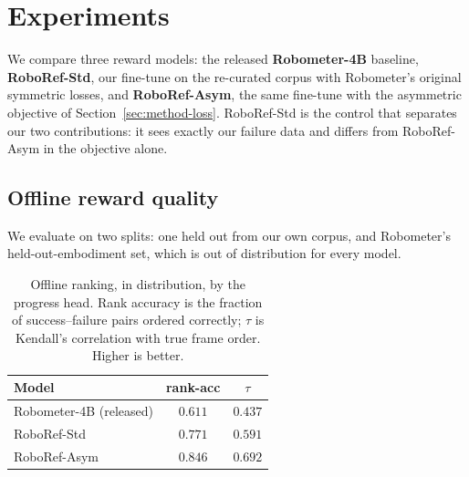 \section{Experiments}
\label{sec:results}

We compare three reward models: the released \textbf{Robometer-4B} baseline,
\textbf{RoboRef-Std}, our fine-tune on the re-curated corpus with Robometer's
original symmetric losses, and \textbf{RoboRef-Asym}, the same fine-tune with the
asymmetric objective of Section~\ref{sec:method-loss}. RoboRef-Std is the control
that separates our two contributions: it sees exactly our failure data and
differs from RoboRef-Asym in the objective alone.

\subsection{Offline reward quality}
\label{sec:results-offline}

We evaluate on two splits: one held out from our own corpus, and Robometer's
held-out-embodiment set, which is out of distribution for every model.

\begin{table}[t]
\centering\footnotesize
\caption{Offline ranking, in distribution, by the progress head. Rank accuracy is
the fraction of success--failure pairs ordered correctly; $\tau$ is Kendall's
correlation with true frame order. Higher is better.}
\label{tab:offline-id-rank}
\begin{tabular}{@{}lcc@{}}
\toprule
Model & rank-acc & $\tau$ \\
\midrule
Robometer-4B (released) & $0.611$ & $0.437$ \\
RoboRef-Std             & $0.771$ & $0.591$ \\
RoboRef-Asym            & $\mathbf{0.846}$ & $\mathbf{0.692}$ \\
\bottomrule
\end{tabular}
\end{table}

